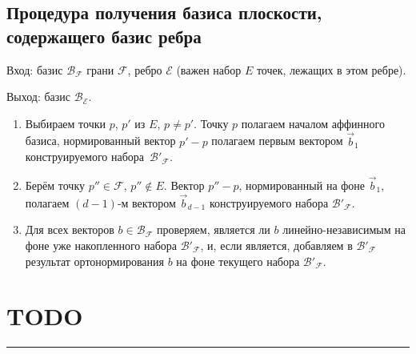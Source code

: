 \documentclass[a4paper,12pt]{article}
\newcommand{\Facet}{\mathcal{F}}              %
\newcommand{\Edge}{\mathcal{E}}               %
\newcommand{\Basis}{\mathcal{B}}              %
\begin{document}
    \subsection{Процедура получения базиса плоскости, содержащего базис ребра}
    Вход: базис $\Basis_{\Facet}$ грани $\Facet$, ребро $\Edge$ (важен набор $E$ точек, лежащих в этом ребре).

    Выход: базис $\Basis_{\Edge}$.
    \begin{enumerate}
      \item Выбираем точки $p$, $p'$ из $E$, $p \neq p'$. Точку $p$ полагаем началом аффинного базиса, нормированный вектор $p'-p$ полагаем первым вектором $\vec b_1$ конструируемого набора~$\Basis'_{\Facet}$.
      \item Берём точку $p'' \in \Facet$, $p'' \notin E$. Вектор $p''-p$, нормированный на фоне $\vec b_1$, полагаем $(d-1)$-м вектором $\vec b_{d-1}$ конструируемого набора $\Basis'_{\Facet}$.
      \item Для всех векторов $b \in \Basis_{\Facet}$ проверяем, является ли $b$ линейно-независимым на фоне уже накопленного набора $\Basis'_{\Facet}$, и, если является, добавляем в $\Basis'_{\Facet}$ результат ортонормирования $b$ на фоне текущего набора $\Basis'_{\Facet}$.
    \end{enumerate}



    \section{TODO}

  \hrule
\end{document}

